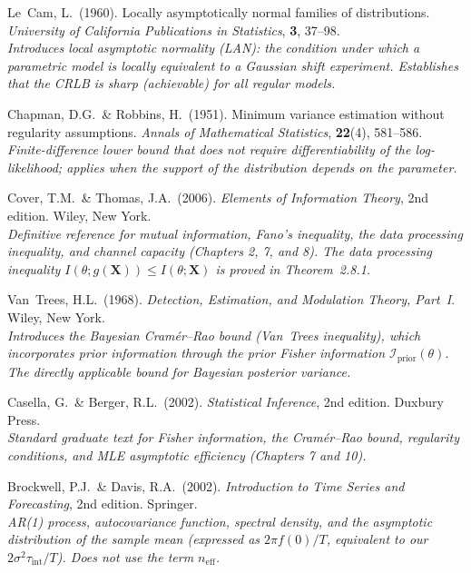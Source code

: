 \documentclass[11pt, a4paper]{article}
\begin{document}
\begin{description}[leftmargin=0pt, itemsep=4pt]
\item[Le~Cam (1960)]
Le~Cam, L.\ (1960).
Locally asymptotically normal families of distributions.
\textit{University of California Publications in Statistics}, \textbf{3}, 37--98.\\
\textit{Introduces local asymptotic normality (LAN): the condition under which a
parametric model is locally equivalent to a Gaussian shift experiment.
Establishes that the CRLB is sharp (achievable) for all regular models.}

\item[Chapman \& Robbins (1951)]
Chapman, D.G.\ \& Robbins, H.\ (1951).
Minimum variance estimation without regularity assumptions.
\textit{Annals of Mathematical Statistics}, \textbf{22}(4), 581--586.\\
\textit{Finite-difference lower bound that does not require differentiability of
the log-likelihood; applies when the support of the distribution depends on
the parameter.}

\item[Cover \& Thomas (2006)]
Cover, T.M.\ \& Thomas, J.A.\ (2006).
\textit{Elements of Information Theory}, 2nd edition.
Wiley, New York.\\
\textit{Definitive reference for mutual information, Fano's inequality, the data
processing inequality, and channel capacity (Chapters 2, 7, and 8).
The data processing inequality $I(\theta;g(\mathbf{X})) \leq I(\theta;\mathbf{X})$
is proved in Theorem~2.8.1.}

\item[Van~Trees (1968)]
Van~Trees, H.L.\ (1968).
\textit{Detection, Estimation, and Modulation Theory, Part~I}.
Wiley, New York.\\
\textit{Introduces the Bayesian Cram\'er--Rao bound (Van~Trees inequality),
which incorporates prior information through the prior Fisher information
$\mathcal{I}_\mathrm{prior}(\theta)$. The directly applicable bound for
Bayesian posterior variance.}

\item[Casella \& Berger (2002)]
Casella, G.\ \& Berger, R.L.\ (2002).
\textit{Statistical Inference}, 2nd edition.
Duxbury Press.\\
\textit{Standard graduate text for Fisher information, the Cram\'er--Rao bound,
regularity conditions, and MLE asymptotic efficiency (Chapters 7 and 10).}

\item[Brockwell \& Davis (2002)]
Brockwell, P.J.\ \& Davis, R.A.\ (2002).
\textit{Introduction to Time Series and Forecasting}, 2nd edition.
Springer.\\
\textit{AR(1) process, autocovariance function, spectral density, and the
asymptotic distribution of the sample mean (expressed as $2\pi f(0)/T$,
equivalent to our $2\sigma^2\tau_\mathrm{int}/T$).
Does not use the term $n_\mathrm{eff}$.}


\end{description}
\end{document}
